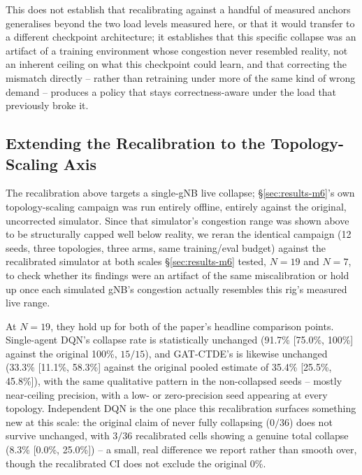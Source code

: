\documentclass[pdflatex,sn-basic,Numbered]{sn-jnl}%
\begin{document}
This does not establish that recalibrating against a handful of measured anchors generalises beyond the two load levels measured here, or that it would transfer to a different checkpoint architecture; it establishes that this specific collapse was an artifact of a training environment whose congestion never resembled reality, not an inherent ceiling on what this checkpoint could learn, and that correcting the mismatch directly -- rather than retraining under more of the same kind of wrong demand -- produces a policy that stays correctness-aware under the load that previously broke it.

\subsection{Extending the Recalibration to the Topology-Scaling Axis}
\label{sec:results-m27}
The recalibration above targets a single-gNB live collapse; \S\ref{sec:results-m6}'s own topology-scaling campaign was run entirely offline, entirely against the original, uncorrected simulator. Since that simulator's congestion range was shown above to be structurally capped well below reality, we reran the identical campaign (12 seeds, three topologies, three arms, same training/eval budget) against the recalibrated simulator at both scales \S\ref{sec:results-m6} tested, $N{=}19$ and $N{=}7$, to check whether its findings were an artifact of the same miscalibration or hold up once each simulated gNB's congestion actually resembles this rig's measured live range.

At $N{=}19$, they hold up for both of the paper's headline comparison points. Single-agent DQN's collapse rate is statistically unchanged (91.7\% [75.0\%, 100\%] against the original 100\%, $15/15$), and GAT-CTDE's is likewise unchanged (33.3\% [11.1\%, 58.3\%] against the original pooled estimate of 35.4\% [25.5\%, 45.8\%]), with the same qualitative pattern in the non-collapsed seeds -- mostly near-ceiling precision, with a low- or zero-precision seed appearing at every topology. Independent DQN is the one place this recalibration surfaces something new at this scale: the original claim of never fully collapsing ($0/36$) does not survive unchanged, with $3/36$ recalibrated cells showing a genuine total collapse (8.3\% [0.0\%, 25.0\%]) -- a small, real difference we report rather than smooth over, though the recalibrated CI does not exclude the original 0\%.
\end{document}
